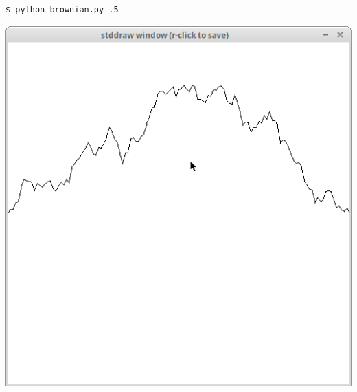 \documentclass[8pt,a4paper,compress]{beamer}
\begin{document}
\begin{frame}[fragile]
\begin{minipage}{160pt}
\begin{lstlisting}[language={}]
$ python brownian.py .5
\end{lstlisting}
\end{minipage}%
\begin{minipage}{140pt}
\hfill \includegraphics[scale=0.15]{figures/brownian2.png}
\end{minipage}

\smallskip


\end{frame}
\end{document}
